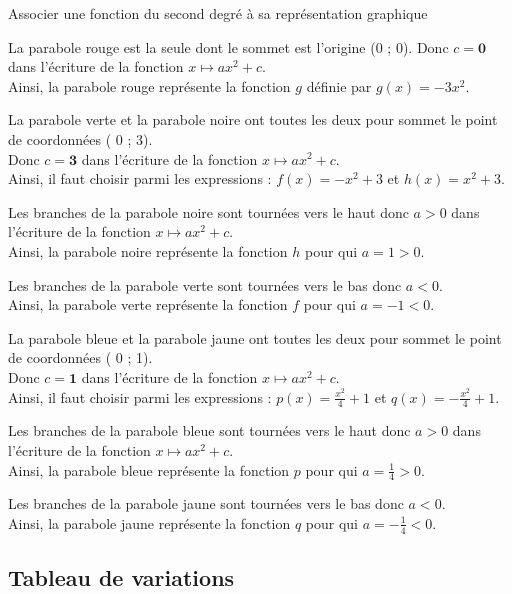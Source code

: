 \begin{bmethodet}{Associer une fonction du second degré à sa représentation graphique}
	\begin{itemMet}
		\item La parabole rouge est la seule dont le sommet est l'origine (0 ; 0). Donc $c=\mathbf{0}$ dans l'écriture de la fonction $x \mapsto a x^{2}+c$.\\
		Ainsi, la parabole rouge représente la fonction $g$ définie par $g(x)=-3 x^{2}$.
		\item La parabole verte et la parabole noire ont toutes les deux pour sommet le point de coordonnées ( 0 ; 3).\\
		Donc $c=\mathbf{3}$ dans l'écriture de la fonction $x \mapsto a x^{2}+c$.\\
		Ainsi, il faut choisir parmi les expressions : $f(x)=-x^{2}+3$ et $h(x)=x^{2}+3$.
		\item Les branches de la parabole noire sont tournées vers le haut donc $a>0$ dans l'écriture de la fonction $x \mapsto a x^{2}+c$.\\
		Ainsi, la parabole noire représente la fonction $h$ pour qui $a=1>0$.
		\item Les branches de la parabole verte sont tournées vers le bas donc $a<0$.\\
		Ainsi, la parabole verte représente la fonction $f$ pour qui $a=-1<0$.
		\item La parabole bleue et la parabole jaune ont toutes les deux pour sommet le point de coordonnées ( 0 ; 1).\\
		Donc $c=\mathbf{1}$ dans l'écriture de la fonction $x \mapsto a x^{2}+c$.\\
		Ainsi, il faut choisir parmi les expressions : $p(x)=\frac{x^{2}}{4}+1$ et $q(x)=-\frac{x^{2}}{4}+1$.
		\item Les branches de la parabole bleue sont tournées vers le haut donc $a>0$ dans l'écriture de la fonction $x \mapsto a x^{2}+c$.\\
		Ainsi, la parabole bleue représente la fonction $p$ pour qui $a=\frac{1}{4}>0$.
		\item Les branches de la parabole jaune sont tournées vers le bas donc $a<0$.\\
		Ainsi, la parabole jaune représente la fonction $q$ pour qui $a=-\frac{1}{4}<0$.
	\end{itemMet}
		
	\end{bmethodet}
	
	\subsection{Tableau de variations}
	
